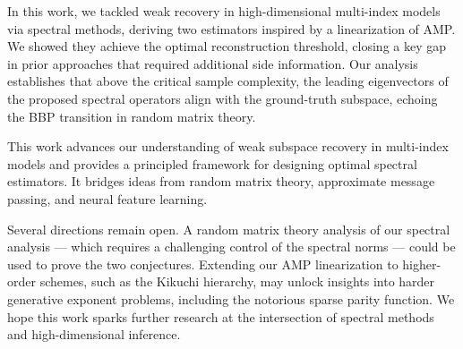 

In this work, we tackled weak recovery in high-dimensional multi-index models via spectral methods, deriving two estimators inspired by a linearization of AMP. We showed they achieve the optimal reconstruction threshold, closing a key gap in prior approaches that required additional side information. Our analysis establishes that above the critical sample complexity, the leading eigenvectors of the proposed spectral operators align with the ground-truth subspace, echoing the BBP transition in random matrix theory.

This work advances our understanding of weak subspace recovery in multi-index models and provides a principled framework for designing optimal spectral estimators. It bridges ideas from random matrix theory, approximate message passing, and neural feature learning.

Several directions remain open. A random matrix theory analysis of our spectral analysis --- which requires a challenging control of the spectral norms --- could be used to prove the two conjectures. Extending our AMP linearization to higher-order schemes, such as the Kikuchi hierarchy, may unlock insights into harder generative exponent problems, including the notorious sparse parity function. We hope this work sparks further research at the intersection of spectral methods and high-dimensional inference.
